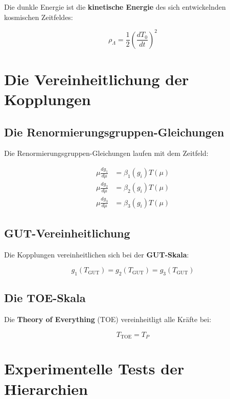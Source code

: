 \documentclass[12pt,a4paper]{report}
\begin{document}
	Die dunkle Energie ist die \textbf{kinetische Energie} des sich entwickelnden kosmischen Zeitfeldes:
	
	\begin{equation}
		\rho_{\Lambda} = \frac{1}{2}\left(\frac{dT_0}{dt}\right)^2
	\end{equation}
	
	\section{Die Vereinheitlichung der Kopplungen}
	
	\subsection{Die Renormierungsgruppen-Gleichungen}
	
	Die Renormierungsgruppen-Gleichungen laufen mit dem Zeitfeld:
	
	\begin{align}
		\mu\frac{dg_1}{d\mu} &= \beta_1(g_i)T(\mu) \\
		\mu\frac{dg_2}{d\mu} &= \beta_2(g_i)T(\mu) \\
		\mu\frac{dg_3}{d\mu} &= \beta_3(g_i)T(\mu)
	\end{align}
	
	\subsection{GUT-Vereinheitlichung}
	
	Die Kopplungen vereinheitlichen sich bei der \textbf{GUT-Skala}:
	
	\begin{equation}
		g_1(T_{\text{GUT}}) = g_2(T_{\text{GUT}}) = g_3(T_{\text{GUT}})
	\end{equation}
	
	\subsection{Die TOE-Skala}
	
	Die \textbf{Theory of Everything} (TOE) vereinheitligt alle Kräfte bei:
	
	\begin{equation}
		T_{\text{TOE}} = T_P
	\end{equation}
	
	\section{Experimentelle Tests der Hierarchien}
	
\end{document}
